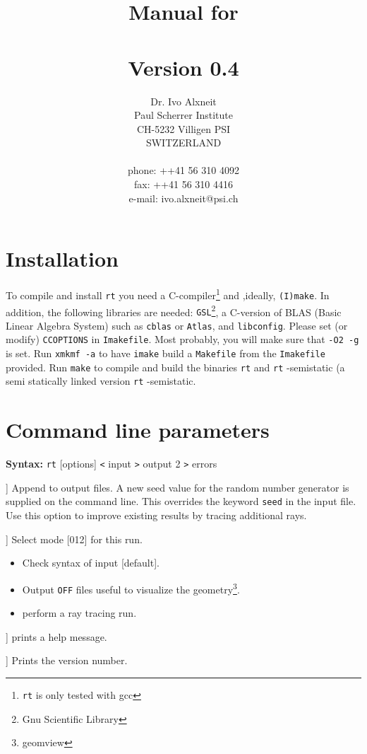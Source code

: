 \documentclass[10pt,a4paper,titlepage]{article}
\title{ {\Huge Manual for \\
		\rt \\
		Version 0.4\\
		\vspace{2cm}}}
\author{Dr. Ivo Alxneit \\
	Paul Scherrer Institute \\
	CH-5232 Villigen PSI \\
	SWITZERLAND \\
	\\
	phone: ++41 56 310 4092 \\
	fax: ++41 56 310 4416 \\
	e-mail: ivo.alxneit@psi.ch \\
	\vspace{4cm}}
\newcommand{\rt}{{\tt rt} }
\begin{document}
\maketitle

\tableofcontents
\pagebreak

\setcounter{page}{1}



\section{Installation}

To compile and install \rt you need a C-compiler\footnote{\rt is only tested with gcc} and ,ideally, {\tt (I)make}. In addition, the following libraries are needed: {\tt GSL}\footnote{Gnu Scientific Library}, a C-version of BLAS (Basic Linear Algebra System) such as {\tt cblas} or {\tt Atlas}, and {\tt libconfig}. Please set (or modify) {\tt CCOPTIONS} in {\tt Imakefile}. Most probably, you will make sure that {\tt -O2 -g} is set. Run {\tt xmkmf -a} to have {\tt imake} build a {\tt Makefile} from the {\tt Imakefile} provided. Run {\tt make} to compile and build the binaries \rt and {\rt-semistatic} (a semi statically linked version {\rt-semistatic}.



\section{Command line parameters}

{\bf Syntax:} \rt [options] {\tt <} input {\tt >} output 2 {\tt >} errors
\vspace{1em}
\begin{list}{}
{\setlength{\leftmargin}{3.5cm}
\setlength{\labelwidth}{3.0cm}
\setlength{\rightmargin}{0.5cm}}

\item[\tt [--append|-a]] Append to output files. A new seed value for the random number generator is supplied on the command line. This overrides the keyword {\tt seed} in the input file. Use this option to improve existing results by tracing additional rays.

\item[\tt [--mode|-m]] Select mode [012] for this run.
\begin{itemize}
\item[\tt -m0]{Check syntax of input [default].}
\item[\tt -m1]{Output {\tt OFF} files useful to visualize the geometry\footnote{geomview}.}
\item[\tt -m2]{perform a ray tracing run.}
\end{itemize}

\item[\tt [--help|-h]] prints a help message.

\item[\tt [--Version|-V]] Prints the version number.

\end{list}
\end{document}
